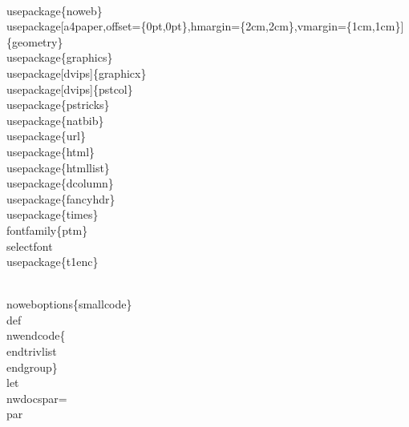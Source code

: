 \documentclass[11pt]{article}
\def\nwendcode{\endtrivlist \endgroup} %
\let\nwdocspar=\par                    %
\begin{document}
\nwenddocs{}\endmoddef
\\usepackage\{noweb\}
\\usepackage[a4paper,offset=\{0pt,0pt\},hmargin=\{2cm,2cm\},vmargin=\{1cm,1cm\}]\{geometry\}
\\usepackage\{graphics\}
\\usepackage[dvips]\{graphicx\}
\\usepackage[dvips]\{pstcol\}
\\usepackage\{pstricks\}
\\usepackage\{natbib\}
\\usepackage\{url\}
\\usepackage\{html\}     
\\usepackage\{htmllist\} 
\\usepackage\{dcolumn\}
\\usepackage\{fancyhdr\} %
\\usepackage\{times\}\\fontfamily\{ptm\}\\selectfont
\\usepackage\{t1enc\}

\\noweboptions\{smallcode\}
\\def\\nwendcode\{\\endtrivlist \\endgroup\} %
\\let\\nwdocspar=\\par                    %
\end{document}
